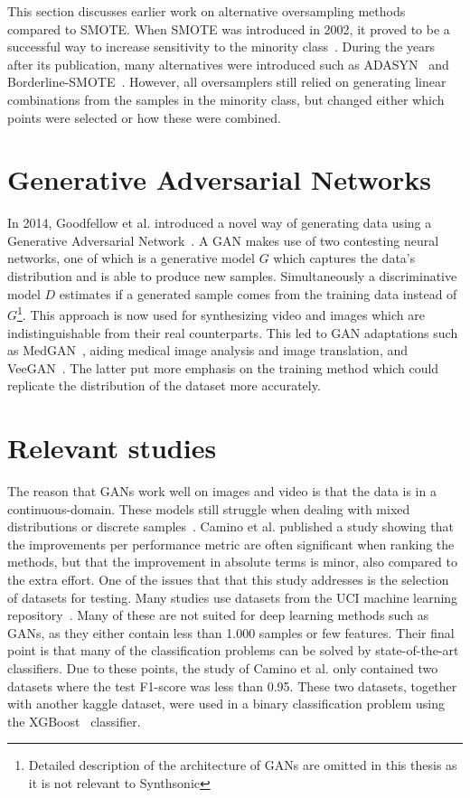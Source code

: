 This section discusses earlier work on alternative oversampling methods compared to SMOTE. When SMOTE was introduced in 2002, it proved to be a successful way to increase sensitivity to the minority class~\cite{Chawla2002SMOTE:Technique}. During the years after its publication, many alternatives were introduced such as ADASYN~\cite{He2008ADASYN:Learning} and Borderline-SMOTE~\cite{Han2005Borderline-SMOTE:Learning}. However, all oversamplers still relied on generating linear combinations from the samples in the minority class, but changed either which points were selected or how these were combined. 

\section{Generative Adversarial Networks}
In 2014, Goodfellow et al. introduced a novel way of generating data using a Generative Adversarial Network~\cite{Goodfellow2014GenerativeNets}. A GAN makes use of two contesting neural networks, one of which is a generative model $G$ which captures the data's distribution and is able to produce new samples. Simultaneously a discriminative model $D$ estimates if a generated sample comes from the training data instead of $G$\footnote{Detailed description of the architecture of GANs are omitted in this thesis as it is not relevant to Synthsonic}. This approach is now used for synthesizing video and images which are indistinguishable from their real counterparts. This led to GAN adaptations such as MedGAN~\cite{Armanious2018MedGAN:GANs}, aiding medical image analysis and image translation, and VeeGAN~\cite{Srivastava2017VEEGAN:Learning}. The latter put more emphasis on the training method which could replicate the distribution of the dataset more accurately.

\section{Relevant studies}
The reason that GANs work well on images and video is that the data is in a continuous-domain. These models still struggle when dealing with mixed distributions or discrete samples~\cite{Camino2020OversamplingEffort}. Camino et al. published a study showing that the improvements per performance metric are often significant when ranking the methods, but that the improvement in absolute terms is minor, also compared to the extra effort. One of the issues that that this study addresses is the selection of datasets for testing. Many studies use datasets from the UCI machine learning repository~\cite{Dua2017UCIRepository}. Many of these are not suited for deep learning methods such as GANs, as they either contain less than 1.000 samples or few features. Their final point is that many of the classification problems can be solved by state-of-the-art classifiers. Due to these points, the study of Camino et al. only contained two datasets where the test F1-score was less than 0.95. These two datasets, together with another kaggle dataset, were used in a binary classification problem using the XGBoost~\cite{Chen2016XGBoost:System} classifier. 

